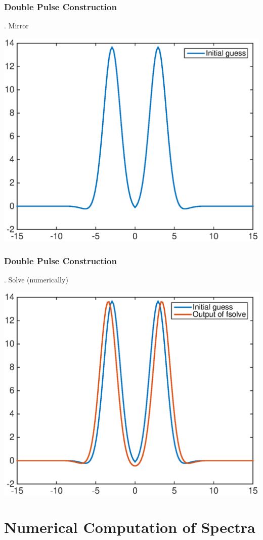 \documentclass[16pt]{beamer}
\begin{document}
\begin{frame}
	\frametitle{Double Pulse Construction}
	\fontsize{16}{7.2}. Mirror
	\begin{center}
	\includegraphics[width=0.8\linewidth]{images/dp1before.eps}
	\end{center}
\end{frame}

\begin{frame}
	\frametitle{Double Pulse Construction}
	\fontsize{16}{7.2}. Solve (numerically)
	\begin{center}
	\includegraphics[width=0.8\linewidth]{images/dp1after.eps}
	\end{center}
\end{frame}

\section{Numerical Computation of Spectra}
\end{document}

